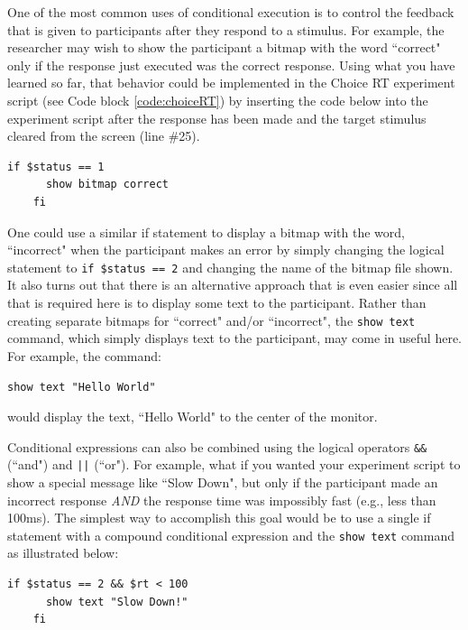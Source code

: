 One of the most common uses of conditional execution is to control the feedback that is given to participants after they respond to a stimulus.  For example, the researcher may wish to show the participant a bitmap with the word ``correct" only if the response just executed was the correct response.  Using what you have learned so far, that behavior could be implemented in the Choice RT experiment script (see Code block \ref{code:choiceRT}) by inserting the code below into the experiment script after the response has been made and the target stimulus cleared from the screen (line \#25).
\begin{Verbatim}[xleftmargin=2.1in]
    if $status == 1
      show bitmap correct
    fi
\end{Verbatim}

One could use a similar if statement to display a bitmap with the word, ``incorrect" when the participant makes an error by simply changing the logical statement to \texttt{if \$status == 2} and changing the name of the bitmap file shown. It also turns out that there is an alternative approach that is even easier since all that is required here is to display some text to the participant.  Rather than creating separate bitmaps for ``correct" and/or ``incorrect", the \texttt{show text} command, which simply displays text to the participant, may come in useful here.  For example, the command:\\
\begin{center}\texttt{show text "Hello World"}\end{center}
would display the text, ``Hello World" to the center of the monitor.

Conditional expressions can also be combined using the logical operators \texttt{\&\&} (``and") and \texttt{||} (``or").  For example, what if you wanted your experiment script to show a special message like ``Slow Down", but only if the participant made an incorrect response \emph{AND} the response time was impossibly fast (e.g., less than 100ms).  The simplest way to accomplish this goal would be to use a single if statement with a compound conditional expression and the \texttt{show text} command as illustrated below:
\begin{Verbatim}[xleftmargin=2in]
    if $status == 2 && $rt < 100
      show text "Slow Down!"
    fi
\end{Verbatim}

